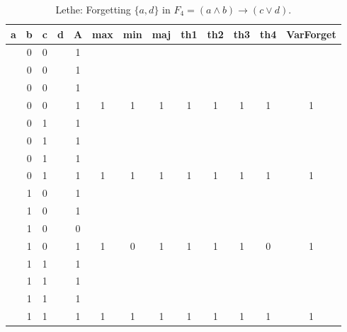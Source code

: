 \begin{table}[!tb]
    \centering
    \begin{tabular}{|c|c|c|c|c|c|c|c|c|c|c|c|c|}
        \hline
        \textbf{a} & \textbf{b} & \textbf{c} & \textbf{d} & \textbf{A} & \textbf{max} & \textbf{min} & \textbf{maj} & \textbf{th1} & \textbf{th2} & \textbf{th3} & \textbf{th4} & \textbf{VarForget} \\ \hline
        \rowcolor{gray!40}  & 0 & 0 &  & 1 &  &  &  &  &  &  &  &  \\ \hline
        \rowcolor{gray!40}  & 0 & 0 &  & 1 &  &  &  &  &  &  &  &  \\ \hline
        \rowcolor{gray!40}  & 0 & 0 &  & 1 &  &  &  &  &  &  &  &  \\ \hline
        \rowcolor{gray!40}  & 0 & 0 &  & 1 & 1 & 1 & 1 & 1 & 1 & 1 & 1 & 1 \\ \hline
        \rowcolor{blue!40}  & 0 & 1 &  & 1 &  &  &  &  &  &  &  &  \\ \hline
        \rowcolor{blue!40}  & 0 & 1 &  & 1 &  &  &  &  &  &  &  &  \\ \hline
        \rowcolor{blue!40}  & 0 & 1 &  & 1 &  &  &  &  &  &  &  &  \\ \hline
        \rowcolor{blue!40}  & 0 & 1 &  & 1 & 1 & 1 & 1 & 1 & 1 & 1 & 1 & 1 \\ \hline
        \rowcolor{red!40}  & 1 & 0 &  & 1 &  &  &  &  &  &  &  &  \\ \hline
        \rowcolor{red!40}  & 1 & 0 &  & 1 &  &  &  &  &  &  &  &  \\ \hline
        \rowcolor{red!40}  & 1 & 0 &  & 0 &  &  &  &  &  &  &  &  \\ \hline
        \rowcolor{red!40}  & 1 & 0 &  & 1 & 1 & 0 & 1 & 1 & 1 & 1 & 0 & 1 \\ \hline
        \rowcolor{green!40}  & 1 & 1 &  & 1 &  &  &  &  &  &  &  &  \\ \hline
        \rowcolor{green!40}  & 1 & 1 &  & 1 &  &  &  &  &  &  &  &  \\ \hline
        \rowcolor{green!40}  & 1 & 1 &  & 1 &  &  &  &  &  &  &  &  \\ \hline
        \rowcolor{green!40}  & 1 & 1 &  & 1 & 1 & 1 & 1 & 1 & 1 & 1 & 1 & 1 \\ \hline
    \end{tabular}
    \caption{Lethe: Forgetting $\{a, d\}$ in $F_{4} = (a \land b) \rightarrow (c \lor d)$.}
    \label{tab:lethe-F4-ad}
\end{table}
